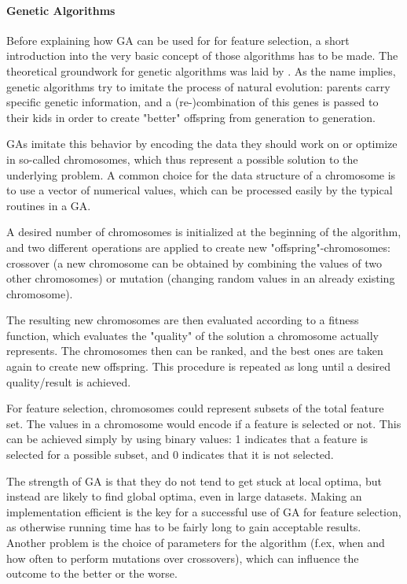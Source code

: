 \paragraph{Genetic Algorithms}
\label{par:methods.flat.wrapper.genetic}


Before explaining how GA can be used for for feature selection, a short introduction into the very basic concept of those algorithms has to be made. 
The theoretical groundwork for genetic algorithms was laid by \cite{Holland:92}. As the name implies, 
genetic algorithms try to imitate the process of natural evolution: parents carry specific genetic information, 
and a (re-)combination of this genes is passed to their kids in order to create "better" offspring from generation to generation. 

GAs imitate this behavior by encoding the data they should work on or optimize in so-called chromosomes, which thus represent
a possible solution to the underlying problem. A common choice for the data structure of a chromosome is to use a vector of numerical values, 
which can be processed easily by the typical routines in a GA. 

A desired number of chromosomes is initialized at the beginning of the algorithm, and two different operations are applied to create 
new "offspring"-chromosomes: crossover (a new chromosome can be obtained by combining the values of two other chromosomes) 
or mutation (changing random values in an already existing chromosome). 

The resulting new chromosomes are then evaluated according to a fitness function, 
which evaluates the "quality" of the solution a chromosome actually represents. 
The chromosomes then can be ranked, and the best ones are taken again to create new offspring. 
This procedure is repeated as long until a desired quality/result is achieved.

For feature selection, chromosomes could represent subsets of the total feature set. 
The values in a chromosome would encode if a feature is selected or not. This can be achieved simply by using binary values: 
1 indicates that a feature is selected for a possible subset, and 0 indicates that it is not selected. 

The strength of GA is that they do not tend to get stuck at local optima, but instead are likely to find global optima, even in large datasets.
Making an implementation efficient is the key for a successful use of GA for feature selection, as otherwise running time has to be
fairly long to gain acceptable results. Another problem is the choice of parameters for the algorithm (f.ex, when and how often to perform mutations
over crossovers), which can influence the outcome to the better or the worse. 

